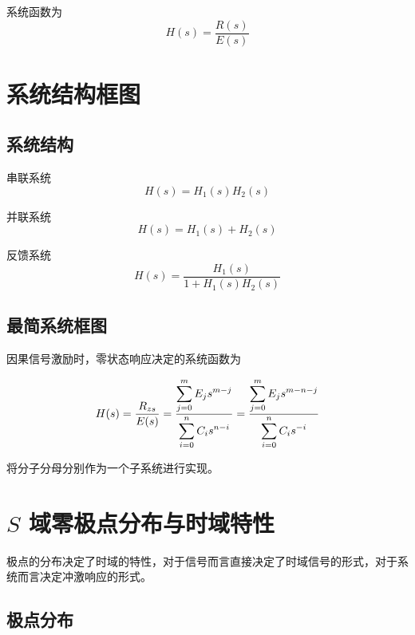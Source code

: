 \documentclass[cn,11pt,chinese,black,simple]{../elegantbook}
\begin{document}
系统函数为 
\[H(s) = \dfrac{R(s)}{E(s)}\]



\section{系统结构框图}


\subsection{系统结构}

串联系统 \[H(s) = H_1(s) H_2(s)\]


并联系统 \[H(s) = H_1(s) + H_2(s)\]


反馈系统 \[H(s) = \dfrac{H_1(s)}{1 + H_1(s) H_2(s) }\]


\subsection{最简系统框图}

因果信号激励时，零状态响应决定的系统函数为 

\[H(s) = \dfrac{R_{zs}}{E(s)} = \dfrac{\displaystyle\sum_{j=0}^{m}E_j s^{m-j}}{\displaystyle\sum_{i = 0}^{n} C_i s^{n-i}} = \dfrac{\displaystyle\sum_{j=0}^{m} E_j s^{m-n-j}}{\displaystyle\sum_{i=0}^n C_i s^{-i}}\]

将分子分母分别作为一个子系统进行实现。

\section{\(S\) 域零极点分布与时域特性}

极点的分布决定了时域的特性，对于信号而言直接决定了时域信号的形式，对于系统而言决定冲激响应的形式。

\subsection{极点分布}
\end{document}
